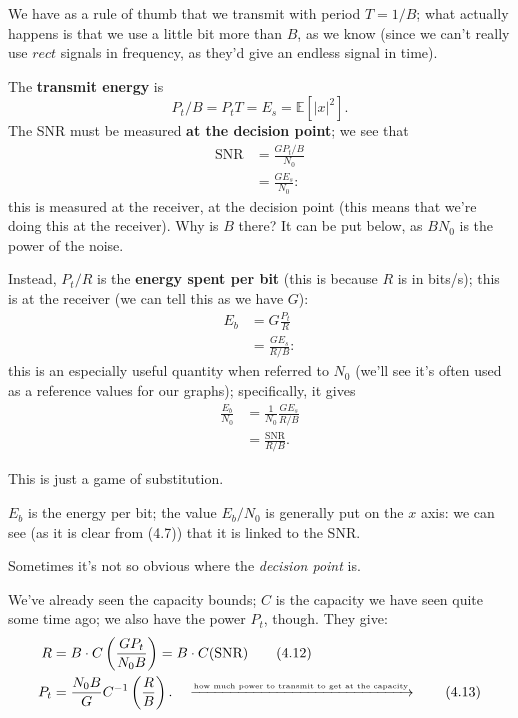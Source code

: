 \documentclass[a4paper, 12pt]{book}
\begin{document}
We have as a rule of thumb that we transmit with period $T = 1/B$; what actually happens is that we use a little bit more than $B$, as we know (since we can't really use $rect$ signals in frequency, as they'd give an endless signal in time).

The \textbf{transmit energy} is
\begin{equation}
    P_t/B = P_t T = E_s = \mathbb{E}[|x|^2] .
\end{equation}
The SNR must be measured \textbf{at the decision point}; we see that
\begin{align}
    \text{SNR} &= \frac{GP_t/B}{N_0} \tag{4.2} \\
    &= \frac{GE_s}{N_0} : \tag{4.3}
\end{align}
this is measured at the receiver, at the decision point (this means that we're doing this at the receiver). Why is $B$ there? It can be put below, as $BN_0$ is the power of the noise.

Instead, $P_t/R$ is the \textbf{energy spent per bit} (this is because $R$ is in bits/s); this is at the receiver (we can tell this as we have $G$):
\begin{align}
    E_b &= G \frac{P_t}{R} \tag{4.4} \\
    &= \frac{GE_s}{R/B} : \tag{4.5}
\end{align}
this is an especially useful quantity when referred to $N_0$ (we'll see it's often used as a reference values for our graphs); specifically, it gives
\begin{align}
    \frac{E_b}{N_0} &= \frac{1}{N_0} \frac{GE_s}{R/B} \tag{4.6} \\
    &= \frac{\text{SNR}}{R/B} . \tag{4.7}
\end{align}

\begin{greenbar}
This is just a game of substitution.
\end{greenbar}

$E_b$ is the energy per bit; the value $E_b/N_0$ is generally put on the $x$ axis: we can see (as it is clear from (4.7)) that it is linked to the SNR.

\begin{greenbar}
Sometimes it's not so obvious where the \textit{decision point} is.
\end{greenbar}

We've already seen the capacity bounds; $C$ is the capacity we have seen quite some time ago; we also have the power $P_t$, though. They give:
\begin{align}
    R &= B \cdot C \left( \frac{GP_t}{N_0 B} \right) = B \cdot C(\text{SNR}) \tag{4.12} \\
    P_t &= \frac{N_0 B}{G} C^{-1} \left( \frac{R}{B} \right) . \quad \xrightarrow{\text{\tiny how much power to transmit to get at the capacity}} \tag{4.13}
\end{align}
\end{document}
